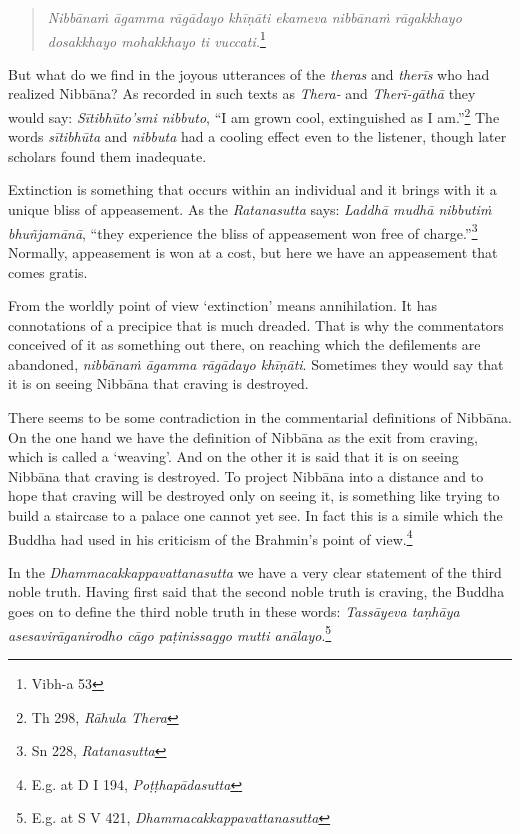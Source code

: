\begin{quote}
\emph{Nibbānaṁ āgamma rāgādayo khīṇāti ekameva nibbānaṁ rāgakkhayo dosakkhayo mohakkhayo ti vuccati.}\footnote{Vibh-a 53}
\end{quote}

But what do we find in the joyous utterances of the \emph{theras} and \emph{therīs} who had realized Nibbāna? As recorded in such texts as \emph{Thera-} and \emph{Therī-gāthā} they would say: \emph{Sītibhūto'smi nibbuto}, ``I am grown cool, extinguished as I am.''\footnote{Th 298, \emph{Rāhula Thera}} The words \emph{sītibhūta} and \emph{nibbuta} had a cooling effect even to the listener, though later scholars found them inadequate.

Extinction is something that occurs within an individual and it brings with it a unique bliss of appeasement. As the \emph{Ratanasutta} says: \emph{Laddhā mudhā nibbutiṁ bhuñjamānā}, ``they experience the bliss of appeasement won free of charge.''\footnote{Sn 228, \emph{Ratanasutta}} Normally, appeasement is won at a cost, but here we have an appeasement that comes gratis.

From the worldly point of view `extinction' means annihilation. It has connotations of a precipice that is much dreaded. That is why the commentators conceived of it as something out there, on reaching which the defilements are abandoned, \emph{nibbānaṁ āgamma rāgādayo khīṇāti}. Sometimes they would say that it is on seeing Nibbāna that craving is destroyed.

There seems to be some contradiction in the commentarial definitions of Nibbāna. On the one hand we have the definition of Nibbāna as the exit from craving, which is called a `weaving'. And on the other it is said that it is on seeing Nibbāna that craving is destroyed. To project Nibbāna into a distance and to hope that craving will be destroyed only on seeing it, is something like trying to build a staircase to a palace one cannot yet see. In fact this is a simile which the Buddha had used in his criticism of the Brahmin's point of view.\footnote{E.g. at D I 194, \emph{Poṭṭhapādasutta}}

In the \emph{Dhammacakkappavattanasutta} we have a very clear statement of the third noble truth. Having first said that the second noble truth is craving, the Buddha goes on to define the third noble truth in these words: \emph{Tassāyeva taṇhāya asesavirāganirodho cāgo paṭinissaggo mutti anālayo}.\footnote{E.g. at S V 421, \emph{Dhammacakkappavattanasutta}}

